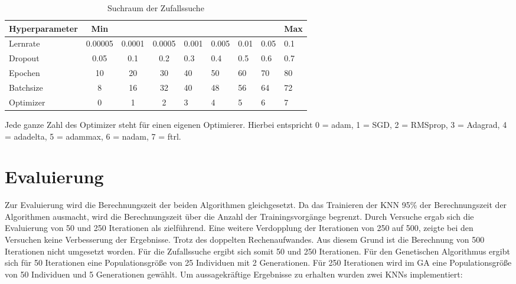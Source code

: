 \begin{table}[htb]
\caption{Suchraum der Zufallssuche} \label{tab:Raster}
\begin{tabular}{lccclllll}\toprule
\textbf{Hyperparameter} &\textbf{Min}   &   &   &   &   &  &   &\textbf{Max}	\\\midrule
Lernrate       & 0.00005 & 0.0001 & 0.0005 & 0.001 & 0.005 & 0.01 & 0.05 & 0.1  \\
Dropout        & 0.05    & 0.1    & 0.2    & 0.3   & 0.4   & 0.5  & 0.6  & 0.7  \\
Epochen        & 10      & 20     & 30     & 40    & 50    & 60   & 70   & 80   \\
Batchsize      & 8       & 16     & 32     & 40    & 48    & 56   & 64   & 72   \\
Optimizer      & 0       & 1      & 2      & 3     & 4     & 5    & 6    & 7    \\\bottomrule
\end{tabular}
\end{table}

Jede ganze Zahl des Optimizer steht für einen eigenen Optimierer. Hierbei entspricht 0 = adam, 1 = SGD, 2 = RMSprop, 3 = Adagrad, 4 = adadelta, 5 = adammax, 6 = nadam, 7 = ftrl.

\section{Evaluierung} 
\label{sec:Evaluierung}
Zur Evaluierung wird die Berechnungszeit der beiden Algorithmen gleichgesetzt. Da das Trainieren der KNN 95\% der Berechnungszeit der Algorithmen ausmacht, wird die Berechnungszeit über die Anzahl der Trainingsvorgänge begrenzt. Durch Versuche ergab sich die Evaluierung von 50 und 250 Iterationen als zielführend. Eine weitere Verdopplung der Iterationen von 250 auf 500, zeigte bei den Versuchen keine Verbesserung der Ergebnisse. Trotz des doppelten Rechenaufwandes. Aus diesem Grund ist die Berechnung von 500 Iterationen nicht umgesetzt worden. Für die Zufallssuche ergibt sich somit 50 und 250 Iterationen. Für den Genetischen Algorithmus ergibt sich für 50 Iterationen eine Populationsgröße von 25 Individuen mit 2 Generationen. Für 250 Iterationen wird im GA eine Populationsgröße von 50 Individuen und 5 Generationen gewählt. Um aussagekräftige Ergebnisse zu erhalten wurden zwei KNNs implementiert:


